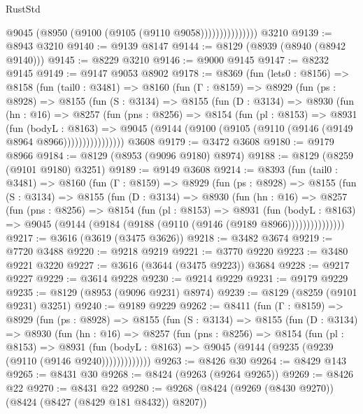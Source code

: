 \begin{lexlean}{RustStd}
\begin{coremodule}
                        @9045 (@8950 (@9100 (@9105 (@9110 @9058)))))))))))))))
    @3210
@9139 := @8943 @3210
@9140 := @9139 @8147
@9144 := @8129 (@8939 (@8940 (@8942 @9140)))
@9145 := @8229 @3210
@9146 := @9000 @9145
@9147 := @8232 @9145
@9149 := @9147 @9053 @8902
@9178 := @8369
    (fun (lets0 : @8156) =>
    @8158
      (fun (tail0 : @3481) =>
      @8160
        (fun (Γ : @8159) =>
        @8929
          (fun (ps : @8928) =>
          @8155
            (fun (S : @3134) =>
            @8155
              (fun (D : @3134) =>
              @8930
                (fun (hn : @16) =>
                @8257
                  (fun (pns : @8256) =>
                  @8154
                    (fun (pl : @8153) =>
                    @8931
                      (fun (bodyL : @8163) =>
                      @9045 (@9144 (@9100 (@9105 (@9110 (@9146 (@9149 @8964 @8966))))))))))))))))
    @3608
@9179 := @3472 @3608
@9180 := @9179 @8966
@9184 := @8129 (@8953 (@9096 @9180) @8974)
@9188 := @8129 (@8259 (@9101 @9180) @3251)
@9189 := @9149 @3608
@9214 := @8393
    (fun (tail0 : @3481) =>
    @8160
      (fun (Γ : @8159) =>
      @8929
        (fun (ps : @8928) =>
        @8155
          (fun (S : @3134) =>
          @8155
            (fun (D : @3134) =>
            @8930
              (fun (hn : @16) =>
              @8257
                (fun (pns : @8256) =>
                @8154
                  (fun (pl : @8153) =>
                  @8931
                    (fun (bodyL : @8163) =>
                    @9045 (@9144 (@9184 (@9188 (@9110 (@9146 (@9189 @8966)))))))))))))))
@9217 := @3616 (@3619 (@3475 @3626))
@9218 := @3482 @3674
@9219 := @7720 @3488
@9220 := @9218 @9219
@9221 := @3770 @9220
@9223 := @3480 @9221 @3220
@9227 := @3616 (@3644 (@3475 @9223)) @3684
@9228 := @9217 @9227
@9229 := @3614 @9228
@9230 := @9214 @9229
@9231 := @9179 @9229
@9235 := @8129 (@8953 (@9096 @9231) @8974)
@9239 := @8129 (@8259 (@9101 @9231) @3251)
@9240 := @9189 @9229
@9262 := @8411
    (fun (Γ : @8159) =>
    @8929
      (fun (ps : @8928) =>
      @8155
        (fun (S : @3134) =>
        @8155
          (fun (D : @3134) =>
          @8930
            (fun (hn : @16) =>
            @8257
              (fun (pns : @8256) =>
              @8154
                (fun (pl : @8153) =>
                @8931
                  (fun (bodyL : @8163) =>
                  @9045 (@9144 (@9235 (@9239 (@9110 (@9146 @9240)))))))))))))
@9263 := @8426 @30
@9264 := @8429 @143
@9265 := @8431 @30
@9268 := @8424 (@9263 (@9264 @9265))
@9269 := @8426 @22
@9270 := @8431 @22
@9280 := @9268 (@8424 (@9269 (@8430 @9270)) (@8424 (@8427 (@8429 @181 @8432)) @8207))

\end{coremodule}
\end{lexlean}
